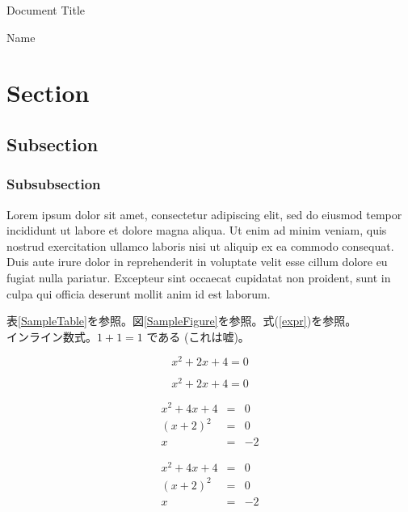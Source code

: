 \documentclass[dvipdfmx,12pt]{ujarticle}
\begin{document}
\begin{center}
    {\Large Document Title}
\end{center}

\begin{flushright}
    Name
\end{flushright}

\section{Section}
\subsection{Subsection}
\subsubsection{Subsubsection}

Lorem ipsum dolor sit amet, consectetur adipiscing elit, sed do eiusmod tempor incididunt ut labore et dolore magna aliqua. Ut enim ad minim veniam, quis nostrud exercitation ullamco laboris nisi ut aliquip ex ea commodo consequat. Duis aute irure dolor in reprehenderit in voluptate velit esse cillum dolore eu fugiat nulla pariatur. Excepteur sint occaecat cupidatat non proident, sunt in culpa qui officia deserunt mollit anim id est laborum.

表\ref{SampleTable}を参照。図\ref{SampleFigure}を参照。式(\ref{expr})を参照。\\インライン数式。$ 1 + 1 = 1 $ である (これは嘘)。


\begin{equation}
    \label{expr}
    x^2 + 2x + 4 = 0
\end{equation}

\begin{displaymath}
    x^2 + 2x + 4 = 0
\end{displaymath}

\begin{eqnarray}
    x ^ 2 + 4x + 4 &=& 0 \nonumber \\
    (x + 2) ^ 2 &=& 0 \nonumber \\
    x &=& -2
\end{eqnarray}

\begin{eqnarray*}
    x ^ 2 + 4x + 4 &=& 0 \\
    (x + 2) ^ 2 &=& 0 \\
    x &=& -2
\end{eqnarray*}
\end{document}
